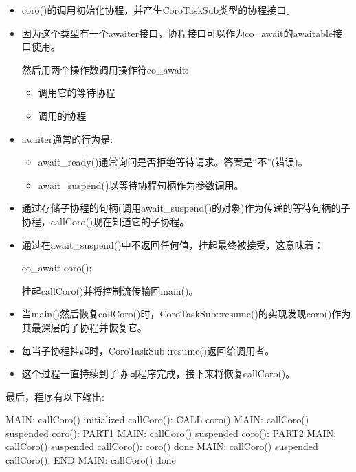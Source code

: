 \begin{itemize}
\item 
coro()的调用初始化协程，并产生CoroTaskSub类型的协程接口。

\item 
因为这个类型有一个awaiter接口，协程接口可以作为co\_await的awaitable接口使用。

然后用两个操作数调用操作符co\_await:

\begin{itemize}
\item 
调用它的等待协程

\item 
调用的协程
\end{itemize}

\item 
awaiter通常的行为是:

\begin{itemize}
\item 
await\_ready()通常询问是否拒绝等待请求。答案是“不”(错误)。

\item 
await\_suspend()以等待协程句柄作为参数调用。
\end{itemize}

\item 
通过存储子协程的句柄(调用await\_suspend()的对象)作为传递的等待句柄的子协程，callCoro()现在知道它的子协程。

\item 
通过在await\_suspend()中不返回任何值，挂起最终被接受，这意味着：
 
\begin{cpp}
co_await coro();
\end{cpp}

挂起callCoro()并将控制流传输回main()。
 
\item 
当main()然后恢复callCoro()时，CoroTaskSub::resume()的实现发现coro()作为其最深层的子协程并恢复它。
 
\item 
每当子协程挂起时，CoroTaskSub::resume()返回给调用者。

\item 
这个过程一直持续到子协同程序完成，接下来将恢复callCoro()。
\end{itemize}

最后，程序有以下输出:

\begin{shell}
MAIN: callCoro() initialized
  callCoro(): CALL coro()
MAIN: callCoro() suspended
    coro(): PART1
MAIN: callCoro() suspended
    coro(): PART2
MAIN: callCoro() suspended
  callCoro(): coro() done
MAIN: callCoro() suspended
  callCoro(): END
MAIN: callCoro() done
\end{shell}

